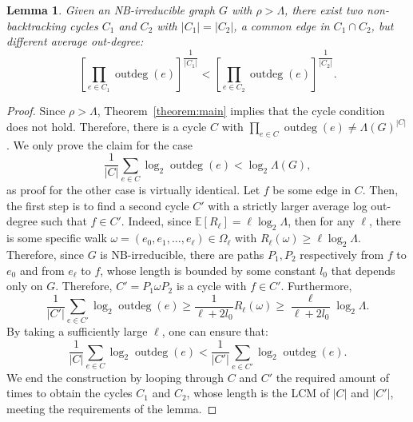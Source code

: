 \documentclass{article}
\newtheorem{lemma}[theorem]{Lemma}
\newcommand{\E}{\mathbb{E}} %
\DeclareMathOperator{\outdeg}{outdeg}
\begin{document}
\begin{lemma}\label{lemma:two_cycles_variance}
    Given an NB-irreducible graph $G$ with $\rho > \Lambda$, there exist two non-backtracking cycles $C_1$ and $C_2$ with $|C_1| = |C_2|$, 
    a common edge in $C_1 \cap C_2$, but different average out-degree:
    \begin{equation*}
        \left[ \prod_{e \in C_1} \outdeg(e) \right]^{\dfrac{1}{|C_1|}} < \left[ \prod_{e \in C_2} \outdeg(e) \right]^{\dfrac{1}{|C_2|}}.
    \end{equation*}
\end{lemma}

\begin{proof}
    Since $\rho>\Lambda$, Theorem~\ref{theorem:main} implies that the cycle condition does not hold.
    Therefore, there is a cycle $C$ with $\prod_{e \in C} \outdeg(e) \neq \Lambda(G)^{|C|}$.
    We only prove the claim for the case
    \begin{equation}
        \frac{1}{|C|} \sum_{e \in C} \log_2 \outdeg(e) < \log_2 \Lambda(G),    
    \end{equation}
    as proof for the other case is virtually identical.
    Let $f$ be some edge in $C$.
    Then, the first step is to find a second cycle $C'$ with a strictly larger average log out-degree such that $f \in C'$.
    Indeed, since $\E[R_\ell] = \ell \log_2 \Lambda$, then for any $\ell$, there is some specific walk $\omega=(e_0,e_1,\ldots,e_\ell) \in \Omega_\ell$ with $R_\ell(\omega) \geq \ell \log_2 \Lambda$.
    Therefore, since $G$ is NB-irreducible, there are paths $P_1,P_2$ respectively from $f$ to $e_0$ and from $e_\ell$ to $f$, 
    whose length is bounded by some constant $l_0$ that depends only on $G$. 
    Therefore, $C' = P_1 \omega P_2$ is a cycle with $f \in C'$.
    Furthermore, 
    \begin{equation*}
               \frac{1}{|C'|} \sum_{e \in C'} \log_2 \outdeg(e)
        \geq    \frac{1}{\ell + 2l_0} R_\ell(\omega)
        \geq   \frac{\ell}{\ell + 2l_0} \log_2\Lambda.
    \end{equation*}
    By taking a sufficiently large $\ell$, one can ensure that:
    \begin{equation}
        \frac{1}{|C|} \sum_{e \in C} \log_2 \outdeg(e) < \frac{1}{|C'|} \sum_{e \in C'} \log_2 \outdeg(e).    
    \end{equation}
    We end the construction by looping through $C$ and $C'$ the required amount of times to obtain the cycles $C_1$ and $C_2$, whose length is  the LCM of $|C|$ and $|C'|$,
    meeting the requirements of the lemma.
\end{proof}
\end{document}
